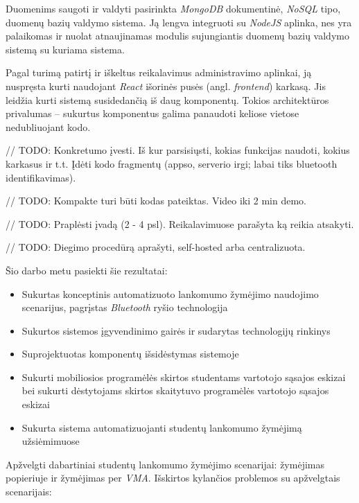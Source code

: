 \documentclass{VUMIFPSkursinis}
\begin{document}
Duomenims saugoti ir valdyti pasirinkta \textit{MongoDB} dokumentinė, \textit{NoSQL} tipo, duomenų bazių valdymo sistema. Ją lengva integruoti su \textit{NodeJS} aplinka, nes yra palaikomas ir nuolat atnaujinamas modulis sujungiantis duomenų bazių valdymo sistemą su kuriama sistema.

Pagal turimą patirtį ir iškeltus reikalavimus administravimo aplinkai, ją nuspręsta kurti naudojant \textit{React} išorinės pusės (angl. \textit{frontend}) karkasą. Jis leidžia kurti sistemą susidedančią iš daug komponentų. Tokios architektūros privalumas – sukurtus komponentus galima panaudoti keliose vietose nedubliuojant kodo.

// TODO: Konkretumo įvesti. Iš kur parsisiųsti, kokias funkcijas naudoti, kokius karkasus ir t.t. Įdėti kodo fragmentų (appso, serverio irgi; labai tiks bluetooth identifikavimas). 

// TODO: Kompakte turi būti kodas pateiktas. Video iki 2 min demo.

// TODO: Praplėsti įvadą (2 - 4 psl). Reikalavimuose parašyta ką reikia atsakyti.

// TODO: Diegimo procedūrą aprašyti, self-hosted arba centralizuota.


Šio darbo metu pasiekti šie rezultatai:

\begin{itemize}

	\item Sukurtas konceptinis automatizuoto lankomumo žymėjimo naudojimo scenarijus, pagrįstas \textit{Bluetooth} ryšio technologija
	\item Sukurtos sistemos įgyvendinimo gairės ir sudarytas technologijų rinkinys
	\item Suprojektuotas komponentų išsidėstymas sistemoje
	\item Sukurti mobiliosios programėlės skirtos studentams vartotojo sąsajos eskizai bei sukurti dėstytojams skirtos skaitytuvo programėlės vartotojo sąsajos eskizai
	\item Sukurta sistema automatizuojanti studentų lankomumo žymėjimą užsiėmimuose
\end{itemize}

Apžvelgti dabartiniai studentų lankomumo žymėjimo scenarijai: žymėjimas popieriuje ir žymėjimas per \textit{VMA}. Išskirtos kylančios problemos su apžvelgtais scenarijais:
\end{document}
